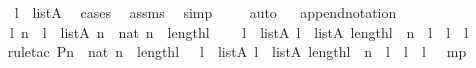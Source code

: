 \begin{isabellebody}
%
\isadelimproof
\isanewline
\ \ %
\endisadelimproof
%
\isatagproof
{}\isamarkupfalse%
\ {\isacartoucheopen}l\ {\isasymin}\ list{\isacharparenleft}{\kern0pt}A{\isacharparenright}{\kern0pt}{\isacartoucheclose}\ \isamarkupfalse%
\ cases\ \isamarkupfalse%
\ assms\ \isamarkupfalse%
\ simp\ \isanewline
\ \ \isamarkupfalse%
\ auto%
\endisatagproof
{\isafoldproof}%
%
\isadelimproof
\ \isanewline
%
\endisadelimproof
\isanewline
{}\isamarkupfalse%
\ append{\isacharunderscore}{\kern0pt}notation\ {\isacharcolon}{\kern0pt}\ \isanewline
\ \ \ l\ n\ \ {\isachardoublequoteopen}l\ {\isasymin}\ list{\isacharparenleft}{\kern0pt}A{\isacharparenright}{\kern0pt}{\isachardoublequoteclose}\ {\isachardoublequoteopen}n\ {\isasymin}\ nat{\isachardoublequoteclose}\ {\isachardoublequoteopen}n\ {\isasymle}\ length{\isacharparenleft}{\kern0pt}l{\isacharparenright}{\kern0pt}{\isachardoublequoteclose}\ \isanewline
\ \ \ {\isachardoublequoteopen}{\isasymexists}l{}\ {\isasymin}\ list{\isacharparenleft}{\kern0pt}A{\isacharparenright}{\kern0pt}{\isachardot}{\kern0pt}\ {\isasymexists}l{}\ {\isasymin}\ list{\isacharparenleft}{\kern0pt}A{\isacharparenright}{\kern0pt}{\isachardot}{\kern0pt}\ length{\isacharparenleft}{\kern0pt}l{}{\isacharparenright}{\kern0pt}\ {\isacharequal}{\kern0pt}\ n\ {\isasymand}\ l\ {\isacharequal}{\kern0pt}\ l{}\ {\isacharat}{\kern0pt}\ l{}{\isachardoublequoteclose}\ \isanewline
%
\isadelimproof
\ \ %
\endisadelimproof
%
\isatagproof
{}\isamarkupfalse%
{\isacharparenleft}{\kern0pt}rule{\isacharunderscore}{\kern0pt}tac\ P{\isacharequal}{\kern0pt}{\isachardoublequoteopen}{\isasymforall}n\ {\isasymin}\ nat{\isachardot}{\kern0pt}\ n\ {\isasymle}\ length{\isacharparenleft}{\kern0pt}l{\isacharparenright}{\kern0pt}\ {\isasymlongrightarrow}\ {\isacharparenleft}{\kern0pt}\ {\isasymexists}l{}\ {\isasymin}\ list{\isacharparenleft}{\kern0pt}A{\isacharparenright}{\kern0pt}{\isachardot}{\kern0pt}\ {\isasymexists}l{}\ {\isasymin}\ list{\isacharparenleft}{\kern0pt}A{\isacharparenright}{\kern0pt}{\isachardot}{\kern0pt}\ length{\isacharparenleft}{\kern0pt}l{}{\isacharparenright}{\kern0pt}\ {\isacharequal}{\kern0pt}\ n\ {\isasymand}\ l\ {\isacharequal}{\kern0pt}\ l{}\ {\isacharat}{\kern0pt}\ l{}\ {\isacharparenright}{\kern0pt}{\isachardoublequoteclose}\ \ mp{\isacharparenright}{\kern0pt}\ \isanewline

\end{isabellebody}

